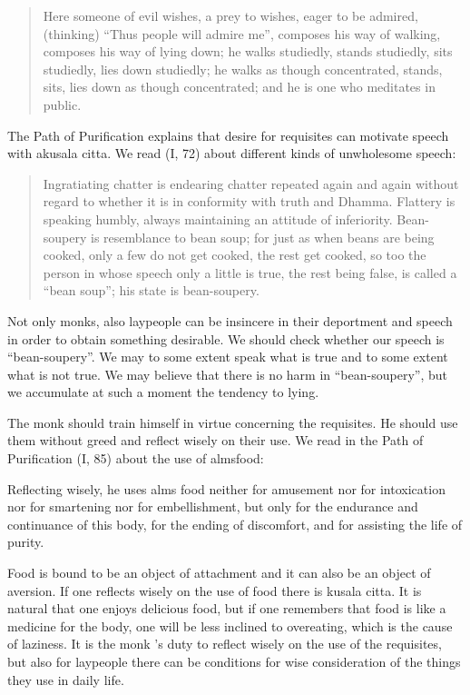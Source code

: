 \documentclass{book}
\begin{document}
\begin{quote}
Here someone of evil wishes, a prey to wishes, eager to be admired,
(thinking) ``Thus people will admire me'', composes his way of walking,
composes his way of lying down; he walks studiedly, stands studiedly,
sits studiedly, lies down studiedly; he walks as though concentrated,
stands, sits, lies down as though concentrated; and he is one who
meditates in public.
\end{quote}

The Path of Purification explains that desire for requisites can
motivate speech with akusala citta. We read (I, 72) about different
kinds of unwholesome speech:

\begin{quote}
Ingratiating chatter is endearing chatter repeated again and again
without regard to whether it is in conformity with truth and Dhamma.
Flattery is speaking humbly, always maintaining an attitude of
inferiority. Bean-soupery is resemblance to bean soup; for just as when
beans are being cooked, only a few do not get cooked, the rest get
cooked, so too the person in whose speech only a little is true, the
rest being false, is called a ``bean soup''; his state is bean-soupery.
\end{quote}

Not only monks, also laypeople can be insincere in their deportment and
speech in order to obtain something desirable. We should check whether
our speech is ``bean-soupery''. We may to some extent speak what is true
and to some extent what is not true. We may believe that there is no
harm in ``bean-soupery'', but we accumulate at such a moment the
tendency to lying.

The monk should train himself in virtue concerning the requisites. He
should use them without greed and reflect wisely on their use. We read
in the Path of Purification (I, 85) about the use of almsfood:

Reflecting wisely, he uses alms food neither for amusement nor for
intoxication nor for smartening nor for embellishment, but only for the
endurance and continuance of this body, for the ending of discomfort,
and for assisting the life of purity.

Food is bound to be an object of attachment and it can also be an object
of aversion. If one reflects wisely on the use of food there is kusala
citta. It is natural that one enjoys delicious food, but if one
remembers that food is like a medicine for the body, one will be less
inclined to overeating, which is the cause of laziness. It is the monk
's duty to reflect wisely on the use of the requisites, but also for
laypeople there can be conditions for wise consider­ation of the things
they use in daily life.
\end{document}

